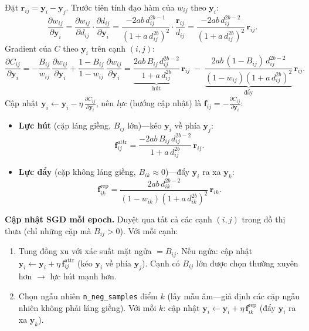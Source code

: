 Đặt $\mathbf{r}_{ij} = \mathbf{y}_i - \mathbf{y}_j$. Trước tiên tính đạo hàm của $w_{ij}$ theo $\mathbf{y}_i$:
\[
\frac{\partial w_{ij}}{\partial \mathbf{y}_i}
= \frac{\partial w_{ij}}{\partial d_{ij}} \cdot \frac{\partial d_{ij}}{\partial \mathbf{y}_i}
= \frac{-2ab\, d_{ij}^{2b-1}}{(1 + a\, d_{ij}^{2b})^2} \cdot \frac{\mathbf{r}_{ij}}{d_{ij}}
= \frac{-2ab\, d_{ij}^{2b-2}}{(1 + a\, d_{ij}^{2b})^2}\,\mathbf{r}_{ij}.
\]
Gradient của $C$ theo $\mathbf{y}_i$ trên cạnh $(i,j)$:
\[
\frac{\partial C_{ij}}{\partial \mathbf{y}_i}
= -\frac{B_{ij}}{w_{ij}}\,\frac{\partial w_{ij}}{\partial \mathbf{y}_i}
+ \frac{1-B_{ij}}{1-w_{ij}}\,\frac{\partial w_{ij}}{\partial \mathbf{y}_i}
= \underbrace{\frac{2ab\, B_{ij}\, d_{ij}^{2b-2}}{1 + a\, d_{ij}^{2b}}}_{\text{hút}}\,\mathbf{r}_{ij}
\;-\; \underbrace{\frac{2ab\,(1-B_{ij})\, d_{ij}^{2b-2}}{(1-w_{ij})(1 + a\, d_{ij}^{2b})^2}}_{\text{đẩy}}\,\mathbf{r}_{ij}.
\]
Cập nhật $\mathbf{y}_i \leftarrow \mathbf{y}_i - \eta\,\frac{\partial C_{ij}}{\partial \mathbf{y}_i}$, nên \emph{lực} (hướng cập nhật) là $\mathbf{f}_{ij} = -\frac{\partial C_{ij}}{\partial \mathbf{y}_i}$:
\begin{itemize}
  \item \textbf{Lực hút} (cặp láng giềng, $B_{ij}$ lớn)---kéo $\mathbf{y}_i$ về phía $\mathbf{y}_j$:
  \[
  \mathbf{f}_{ij}^{\mathrm{attr}} = \frac{-2ab\, B_{ij}\, d_{ij}^{2b-2}}{1 + a\, d_{ij}^{2b}}\,\mathbf{r}_{ij}.
  \]
  \item \textbf{Lực đẩy} (cặp không láng giềng, $B_{ik} \approx 0$)---đẩy $\mathbf{y}_i$ ra xa $\mathbf{y}_k$:
  \[
  \mathbf{f}_{ik}^{\mathrm{rep}} = \frac{2ab\, d_{ik}^{2b-2}}{(1-w_{ik})(1 + a\, d_{ik}^{2b})^2}\,\mathbf{r}_{ik}.
  \]
\end{itemize}

\textbf{Cập nhật SGD mỗi epoch.} Duyệt qua tất cả các cạnh $(i,j)$ trong đồ thị thưa (chỉ những cặp mà $B_{ij} > 0$). Với mỗi cạnh:
\begin{enumerate}
  \item Tung đồng xu với xác suất mặt ngửa $= B_{ij}$. Nếu ngửa: cập nhật $\mathbf{y}_i \leftarrow \mathbf{y}_i + \eta\,\mathbf{f}_{ij}^{\mathrm{attr}}$ (kéo $\mathbf{y}_i$ về phía $\mathbf{y}_j$). Cạnh có $B_{ij}$ lớn được chọn thường xuyên hơn $\to$ lực hút mạnh hơn.
  \item Chọn ngẫu nhiên \texttt{n\_neg\_samples} điểm $k$ (lấy mẫu âm---giả định các cặp ngẫu nhiên không phải láng giềng). Với mỗi $k$: cập nhật $\mathbf{y}_i \leftarrow \mathbf{y}_i + \eta\,\mathbf{f}_{ik}^{\mathrm{rep}}$ (đẩy $\mathbf{y}_i$ ra xa $\mathbf{y}_k$).
\end{enumerate}

